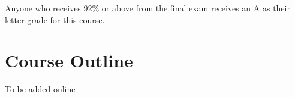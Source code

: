 \documentclass[handout]{ximera}
\begin{document}
Anyone who receives 92\% or above from the final exam receives an A as their letter grade for this course.

\section*{Course Outline}

To be added online


\end{document}
